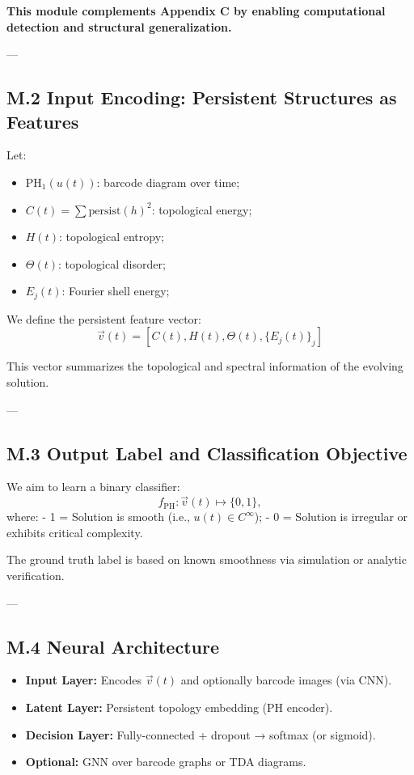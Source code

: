 \documentclass[11pt]{article}
\theoremstyle{definition}
\begin{document}
\textbf{This module complements Appendix C by enabling computational detection and structural generalization.}

---

\subsection*{M.2 Input Encoding: Persistent Structures as Features}

Let:
\begin{itemize}
  \item \( \mathrm{PH}_1(u(t)) \): barcode diagram over time;
  \item \( C(t) = \sum \mathrm{persist}(h)^2 \): topological energy;
  \item \( H(t) \): topological entropy;
  \item \( \Theta(t) \): topological disorder;
  \item \( E_j(t) \): Fourier shell energy;
\end{itemize}

We define the persistent feature vector:
\[
\vec{v}(t) = \left[ C(t), H(t), \Theta(t), \{E_j(t)\}_j \right]
\]

This vector summarizes the topological and spectral information of the evolving solution.

---

\subsection*{M.3 Output Label and Classification Objective}

We aim to learn a binary classifier:
\[
f_{\mathrm{PH}}: \vec{v}(t) \mapsto \{0,1\},
\]
where:
- 1 = Solution is smooth (i.e., \( u(t) \in C^\infty \));
- 0 = Solution is irregular or exhibits critical complexity.

The ground truth label is based on known smoothness via simulation or analytic verification.

---

\subsection*{M.4 Neural Architecture}

\begin{itemize}
  \item \textbf{Input Layer:} Encodes \( \vec{v}(t) \) and optionally barcode images (via CNN).
  \item \textbf{Latent Layer:} Persistent topology embedding (PH encoder).
  \item \textbf{Decision Layer:} Fully-connected + dropout → softmax (or sigmoid).
  \item \textbf{Optional:} GNN over barcode graphs or TDA diagrams.
\end{itemize}
\end{document}
